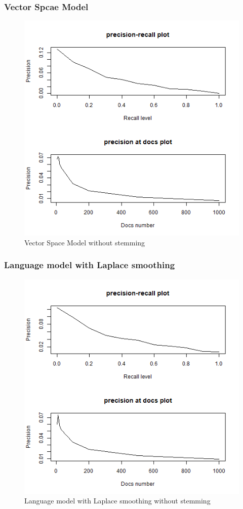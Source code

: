 \documentclass[a4pper,11pt,onecolumn]{article}
\begin{document}
\subsubsection{Vector Spcae Model}

    \begin{figure}[H]
    \centering
    \includegraphics[scale = 0.6]{model2.png}
    \caption{Vector Space Model without stemming}
    \end{figure}
\subsubsection{Language model with Laplace smoothing}

    \begin{figure}[H]
    \caption{Language model with Laplace smoothing without stemming}
    \includegraphics[scale = 0.6]{model4.png}
    \centering
    \end{figure}
\end{document}
